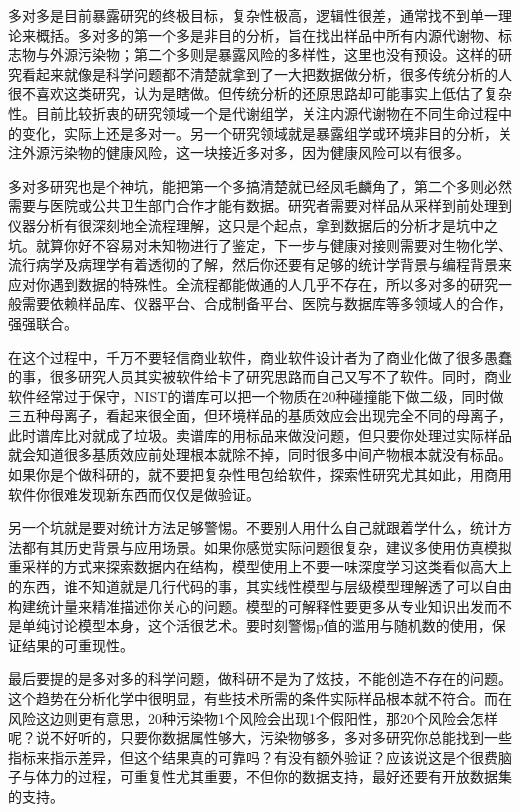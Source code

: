 \documentclass[]{book}
\begin{document}
多对多是目前暴露研究的终极目标，复杂性极高，逻辑性很差，通常找不到单一理论来概括。多对多的第一个多是非目的分析，旨在找出样品中所有内源代谢物、标志物与外源污染物；第二个多则是暴露风险的多样性，这里也没有预设。这样的研究看起来就像是科学问题都不清楚就拿到了一大把数据做分析，很多传统分析的人很不喜欢这类研究，认为是瞎做。但传统分析的还原思路却可能事实上低估了复杂性。目前比较折衷的研究领域一个是代谢组学，关注内源代谢物在不同生命过程中的变化，实际上还是多对一。另一个研究领域就是暴露组学或环境非目的分析，关注外源污染物的健康风险，这一块接近多对多，因为健康风险可以有很多。

多对多研究也是个神坑，能把第一个多搞清楚就已经凤毛麟角了，第二个多则必然需要与医院或公共卫生部门合作才能有数据。研究者需要对样品从采样到前处理到仪器分析有很深刻地全流程理解，这只是个起点，拿到数据后的分析才是坑中之坑。就算你好不容易对未知物进行了鉴定，下一步与健康对接则需要对生物化学、流行病学及病理学有着透彻的了解，然后你还要有足够的统计学背景与编程背景来应对你遇到数据的特殊性。全流程都能做通的人几乎不存在，所以多对多的研究一般需要依赖样品库、仪器平台、合成制备平台、医院与数据库等多领域人的合作，强强联合。

在这个过程中，千万不要轻信商业软件，商业软件设计者为了商业化做了很多愚蠢的事，很多研究人员其实被软件给卡了研究思路而自己又写不了软件。同时，商业软件经常过于保守，NIST的谱库可以把一个物质在20种碰撞能下做二级，同时做三五种母离子，看起来很全面，但环境样品的基质效应会出现完全不同的母离子，此时谱库比对就成了垃圾。卖谱库的用标品来做没问题，但只要你处理过实际样品就会知道很多基质效应前处理根本就除不掉，同时很多中间产物根本就没有标品。如果你是个做科研的，就不要把复杂性甩包给软件，探索性研究尤其如此，用商用软件你很难发现新东西而仅仅是做验证。

另一个坑就是要对统计方法足够警惕。不要别人用什么自己就跟着学什么，统计方法都有其历史背景与应用场景。如果你感觉实际问题很复杂，建议多使用仿真模拟重采样的方式来探索数据内在结构，模型使用上不要一味深度学习这类看似高大上的东西，谁不知道就是几行代码的事，其实线性模型与层级模型理解透了可以自由构建统计量来精准描述你关心的问题。模型的可解释性要更多从专业知识出发而不是单纯讨论模型本身，这个活很艺术。要时刻警惕p值的滥用与随机数的使用，保证结果的可重现性。

最后要提的是多对多的科学问题，做科研不是为了炫技，不能创造不存在的问题。这个趋势在分析化学中很明显，有些技术所需的条件实际样品根本就不符合。而在风险这边则更有意思，20种污染物1个风险会出现1个假阳性，那20个风险会怎样呢？说不好听的，只要你数据属性够大，污染物够多，多对多研究你总能找到一些指标来指示差异，但这个结果真的可靠吗？有没有额外验证？应该说这是个很费脑子与体力的过程，可重复性尤其重要，不但你的数据支持，最好还要有开放数据集的支持。
\end{document}
